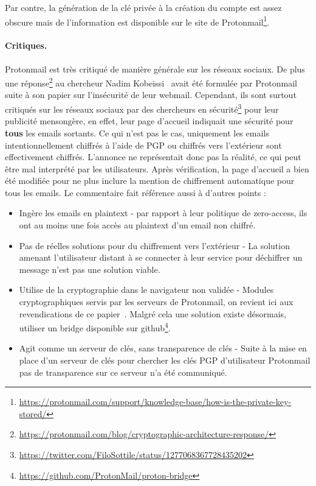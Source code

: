 Par contre, la génération de la clé privée à la création du compte est assez obscure mais de l'information est disponible sur le site de Protonmail\footnote{\url{https://protonmail.com/support/knowledge-base/how-is-the-private-key-stored/}}.

\paragraph*{Critiques.}
Protonmail est très critiqué de manière générale sur les réseaux sociaux. De plus une réponse\footnote{\url{https://protonmail.com/blog/cryptographic-architecture-response/}} au chercheur Nadim Kobeissi~\cite{journals/iacr/Kobeissi18a} avait été formulée par Protonmail suite à son papier sur l'insécurité de leur webmail. Cependant, ils sont surtout critiqués sur les réseaux sociaux par des chercheurs en sécurité\footnote{\url{https://twitter.com/FiloSottile/status/1277068367728435202}} pour leur publicité mensongère, en effet, leur page d'accueil indiquait une sécurité pour \textbf{tous} les emails sortants. Ce qui n'est pas le cas, uniquement les emails intentionnellement chiffrés à l'aide de PGP ou chiffrés vers l'extérieur sont effectivement chiffrés. L'annonce ne représentait donc pas la réalité, ce qui peut être mal interprété par les utilisateurs. Après vérification, la page d'accueil a bien été modifiée pour ne plus inclure la mention de chiffrement automatique pour tous les emails. Le commentaire fait référence aussi à d'autres points :
\begin{itemize}
	\item Ingère les emails en plaintext - par rapport à leur politique de zero-access, ils ont au moins une fois accès au plaintext d'un email non chiffré.
	\item Pas de réelles solutions pour du chiffrement vers l'extérieur - La solution amenant l'utilisateur distant à se connecter à leur service pour déchiffrer un message n'est pas une solution viable.
	\item Utilise de la cryptographie dans le navigateur non validée - Modules cryptographiques servis par les serveurs de Protonmail, on revient ici aux revendications de ce papier~\cite{journals/iacr/Kobeissi18a}. Malgré cela une solution existe désormais, utiliser un bridge disponible sur github\footnote{\url{https://github.com/ProtonMail/proton-bridge}}.
	\item Agit comme un serveur de clés, sans transparence de clés - Suite à la mise en place d'un serveur de clés pour chercher les clés PGP d'utilisateur Protonmail pas de transparence sur ce serveur n'a été communiqué.
\end{itemize}
